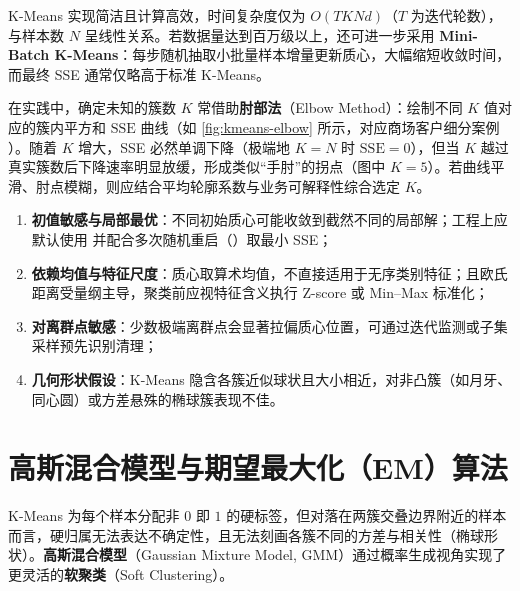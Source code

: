 K-Means 实现简洁且计算高效，时间复杂度仅为 $O(T K N d)$（$T$ 为迭代轮数），与样本数 $N$ 呈线性关系。若数据量达到百万级以上，还可进一步采用 \textbf{Mini-Batch K-Means}：每步随机抽取小批量样本增量更新质心，大幅缩短收敛时间，而最终 SSE 通常仅略高于标准 K-Means。

在实践中，确定未知的簇数 $K$ 常借助\textbf{肘部法}（Elbow Method）：绘制不同 $K$ 值对应的簇内平方和 $\mathrm{SSE}$ 曲线（如 \cref{fig:kmeans-elbow} 所示，对应商场客户细分案例 ）。随着 $K$ 增大，SSE 必然单调下降（极端地 $K=N$ 时 $\mathrm{SSE}=0$），但当 $K$ 越过真实簇数后下降速率明显放缓，形成类似“手肘”的拐点（图中 $K=5$）。若曲线平滑、肘点模糊，则应结合平均轮廓系数与业务可解释性综合选定 $K$。


\begin{pitfall}\label{pit:kmeans-limits}
\begin{enumerate}
  \item \textbf{初值敏感与局部最优}：不同初始质心可能收敛到截然不同的局部解；工程上应默认使用  并配合多次随机重启（）取最小 SSE；
  \item \textbf{依赖均值与特征尺度}：质心取算术均值，不直接适用于无序类别特征；且欧氏距离受量纲主导，聚类前应视特征含义执行 Z-score 或 Min–Max 标准化；
  \item \textbf{对离群点敏感}：少数极端离群点会显著拉偏质心位置，可通过迭代监测或子集采样预先识别清理；
  \item \textbf{几何形状假设}：K-Means 隐含各簇近似球状且大小相近，对非凸簇（如月牙、同心圆）或方差悬殊的椭球簇表现不佳。
\end{enumerate}
\end{pitfall}

\section{高斯混合模型与期望最大化（EM）算法}\label{sec:gmm-em}

K-Means 为每个样本分配非 $0$ 即 $1$ 的硬标签，但对落在两簇交叠边界附近的样本而言，硬归属无法表达不确定性，且无法刻画各簇不同的方差与相关性（椭球形状）。\textbf{高斯混合模型}（Gaussian Mixture Model, GMM）通过概率生成视角实现了更灵活的\textbf{软聚类}（Soft Clustering）。

